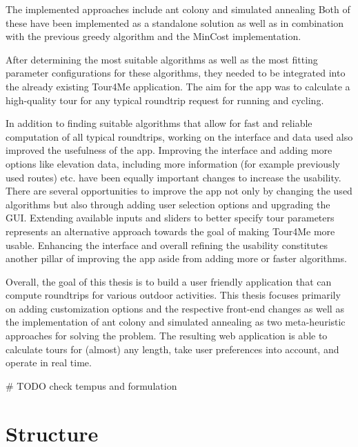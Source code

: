 The implemented approaches include ant colony \cite{babaoglu_anthill_2002, dorigo_ant_1996, gendreau_handbook_2010, wang_application_2014} and simulated annealing \cite{aarts_simulated_2005, delahaye_simulated_2019, eglese_simulated_1990, zhan_list-based_2016}
Both of these have been implemented as a standalone solution as well as in combination with the previous greedy algorithm and the MinCost implementation.

After determining the most suitable algorithms as well as the most fitting parameter configurations for these algorithms, they needed to be integrated into the already existing Tour4Me application. The aim for the app was to calculate a high-quality tour for any typical roundtrip request for running and cycling.

In addition to finding suitable algorithms that allow for fast and reliable computation of all typical roundtrips, working on the interface and data used also improved the usefulness of the app.
Improving the interface and adding more options like elevation data, including more information (for example previously used routes) etc. have been equally important changes to increase the usability.
There are several opportunities to improve the app not only by changing the used algorithms but also through adding user selection options and upgrading the GUI.
Extending available inputs and sliders to better specify tour parameters represents an alternative approach towards the goal of making Tour4Me more usable.
Enhancing the interface and overall refining the usability constitutes another pillar of improving the app aside from adding more or faster algorithms.

Overall, the goal of this thesis is to build a user friendly application that can compute roundtrips for various outdoor activities.
This thesis focuses primarily on adding customization options and the respective front-end changes as well as the implementation of ant colony and simulated annealing as two meta-heuristic approaches for solving the problem.
The resulting web application is able to calculate tours for (almost) any length, take user preferences into account, and operate in real time.


\# TODO check tempus and formulation







\section{Structure}
\label{sec:structure}

